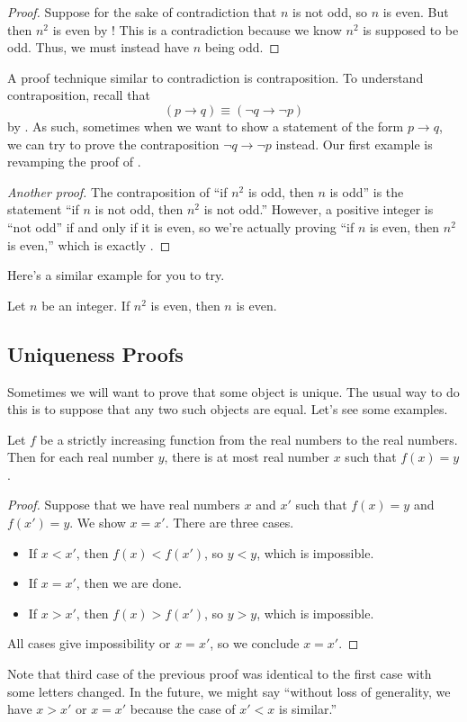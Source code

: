 \documentclass[../notes.tex]{subfiles}
\begin{document}
\begin{proof}
    Suppose for the sake of contradiction that $n$ is not odd, so $n$ is even. But then $n^2$ is even by ! This is a contradiction because we know $n^2$ is supposed to be odd. Thus, we must instead have $n$ being odd.
\end{proof}
A proof technique similar to contradiction is contraposition. To understand contraposition, recall that
\[(p\to q)\equiv(\lnot q\to\lnot p)\]
by . As such, sometimes when we want to show a statement of the form $p\to q$, we can try to prove the contraposition $\lnot q\to\lnot p$ instead. Our first example is revamping the proof of .
\begin{proof}[Another proof]
    The contraposition of ``if $n^2$ is odd, then $n$ is odd'' is the statement ``if $n$ is not odd, then $n^2$ is not odd.'' However, a positive integer is ``not odd'' if and only if it is even, so we're actually proving ``if $n$ is even, then $n^2$ is even,'' which is exactly .
\end{proof}
Here's a similar example for you to try.
\begin{exe}
    Let $n$ be an integer. If $n^2$ is even, then $n$ is even.
\end{exe}

\subsection{Uniqueness Proofs}
Sometimes we will want to prove that some object is unique. The usual way to do this is to suppose that any two such objects are equal. Let's see some examples.
\begin{example} \label{exe:increasing-is-injective}
    Let $f$ be a strictly increasing function from the real numbers to the real numbers. Then for each real number $y$, there is at most real number $x$ such that $f(x)=y$.
\end{example}
\begin{proof}
    Suppose that we have real numbers $x$ and $x'$ such that $f(x)=y$ and $f(x')=y$. We show $x=x'$. There are three cases.
    \begin{itemize}
        \item If $x<x'$, then $f(x)<f(x')$, so $y<y$, which is impossible.
        \item If $x=x'$, then we are done.
        \item If $x>x'$, then $f(x)>f(x')$, so $y>y$, which is impossible.
    \end{itemize}
    All cases give impossibility or $x=x'$, so we conclude $x=x'$.
\end{proof}
Note that third case of the previous proof was identical to the first case with some letters changed. In the future, we might say ``without loss of generality, we have $x>x'$ or $x=x'$ because the case of $x'<x$ is similar.''
\end{document}
